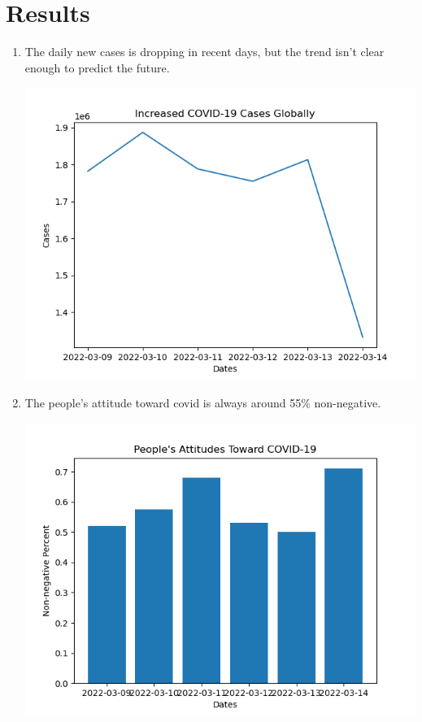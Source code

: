 \documentclass[a4paper, 12pt]{article}
\begin{document}
\section*{Results}
\begin{enumerate}
    \item The daily new cases is dropping in recent days, but the trend isn't clear enough to predict the future.
    \begin{center}
        \includegraphics[scale=0.6]{cases.png}
    \end{center}
    \item The people's attitude toward covid is always around 55\% non-negative.
    \begin{center}
        \includegraphics[scale=0.6]{attitudes.png}

\end{center}
\end{enumerate}
\end{document}
